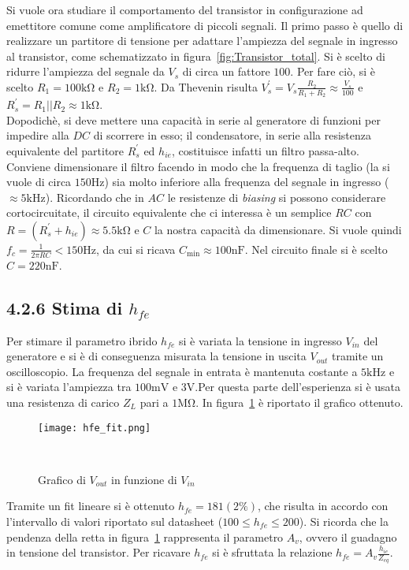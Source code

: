 \documentclass{article}
\begin{document}
Si vuole ora studiare il comportamento del transistor in configurazione ad emettitore comune come amplificatore di piccoli segnali. Il primo passo è quello di realizzare un partitore di tensione per adattare l'ampiezza del segnale in ingresso al transistor, come schematizzato in figura~\ref{fig:Transistor_total}. Si è scelto di ridurre l'ampiezza del segnale da $V_{s}$ di circa un fattore $100$. Per fare ciò, si è scelto $R_{1} = 100 \si{\kilo\ohm}$ e $R_{2} = 1 \si{\kilo\ohm}$. Da Thevenin risulta $V_{s}^{'} = V_{s} \frac{R_{2}}{R_{1}+R_{2}} \approx \frac{V_{s}}{100}$ e $R_{s}^{'} = R_{1}||R_{2} \approx 1 \si{\kilo\ohm}$.\\
Dopodichè, si deve mettere una capacità in serie al generatore di funzioni per impedire alla $DC$ di scorrere in esso; il condensatore, in serie alla resistenza equivalente del partitore $R_{s}^{'}$ ed $h_{ie}$, costituisce infatti un filtro passa-alto.\\ Conviene dimensionare il filtro facendo in modo che la frequenza di taglio (la si vuole di circa $150 \si{\hertz}$) sia molto inferiore alla frequenza del segnale in ingresso ($\approx 5 \si{\kilo\hertz}$). Ricordando che in $AC$ le resistenze di \textit{biasing} si possono considerare cortocircuitate, il circuito equivalente che ci interessa è un semplice $RC$ con $R = (R_{s}^{'} + h_{ie})\approx 5.5 \si{\kilo\ohm}$ e $C$ la nostra capacità da dimensionare. Si vuole quindi $f_{c} = \frac{1}{2\pi R C} < 150 \si{\hertz}$, da cui si ricava $C_{\min} \approx 100 \si{\nano\farad}$. Nel circuito finale si è scelto $C = 220 \si{\nano\farad}$.\\


\subsection*{4.2.6  Stima di $h_{fe}$}

Per stimare il parametro ibrido $h_{fe}$ si è variata la tensione in ingresso $V_{in}$ del generatore e si è di conseguenza misurata la tensione in uscita $V_{out}$ tramite un oscilloscopio.
La frequenza del segnale in entrata è mantenuta costante a $5 \si{\kilo\hertz}$ e si è variata l'ampiezza tra $100 \si{\milli\volt}$ e $3 \si{\volt}$.Per questa parte dell'esperienza si è usata una resistenza di carico $Z_{L}$ pari a $1 \si{\mega\ohm}$. In figura~\ref{fig:h_fe} è riportato il grafico ottenuto.\\

\begin{figure}[!h]
    \centering
    \texttt{[image: hfe\_fit.png]}
    \caption{Grafico di $V_{out}$ in funzione di $V_{in}$}
~\label{fig:h_fe}
\end{figure}

Tramite un fit lineare si è ottenuto $h_{fe} = 181(2\%)$, che risulta in accordo con l'intervallo di valori riportato sul datasheet ($100 \le h_{fe} \le 200$). Si ricorda che la pendenza della retta in figura~\ref{fig:h_fe} rappresenta il parametro $A_{v}$, ovvero il guadagno in tensione del transistor. Per ricavare $h_{fe}$ si è sfruttata la relazione $h_{fe} = A_{v} \frac{h_{ie}}{Z_{eq}}$.
\end{document}
